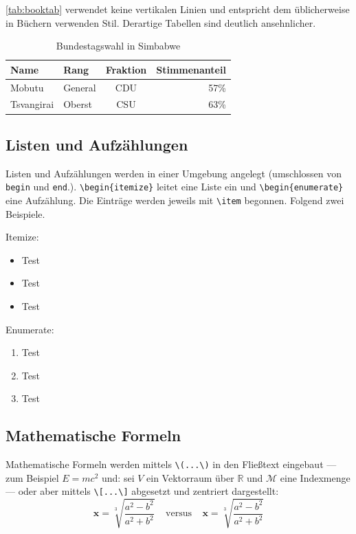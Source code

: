 \autoref{tab:booktab} verwendet keine vertikalen Linien und entspricht dem üblicherweise in Büchern verwenden Stil. Derartige Tabellen sind deutlich ansehnlicher.

\begin{table}[h]
\centering
\begin{tabular} {llcr}
	\toprule
	Name & Rang & Fraktion & Stimmenanteil \\
	\midrule
	Mobutu & General & CDU & 57\% \\
	Tsvangirai & Oberst & CSU & 63\% \\
	\bottomrule
\end{tabular}
\caption {Bundestagswahl in Simbabwe}
\label{tab:booktab}
\end{table}

\subsection{Listen und Aufzählungen}

Listen und Aufzählungen werden in einer Umgebung angelegt (umschlossen von \verb|begin| und \verb|end|.). \verb|\begin{itemize}| leitet eine Liste ein und \verb|\begin{enumerate}| eine Aufzählung. Die Einträge werden jeweils mit \verb|\item| begonnen. Folgend zwei Beispiele.

Itemize:
\begin{itemize}
\item Test
\item Test
\item Test
\end{itemize}

Enumerate:
\begin{enumerate}
\item Test
\item Test
\item Test
\end{enumerate}

\subsection{Mathematische Formeln}

Mathematische Formeln werden mittels \verb|\(...\)|
in den Fließtext eingebaut
--- zum Beispiel \( E=mc^2 \) und:
sei \(V\) ein Vektorraum über \(\mathbb{R}\)
und \(\mathcal{M}\) eine Indexmenge
---
oder aber mittels \verb|\[...\]|
abgesetzt und zentriert dargestellt:
	\[
	\pmb{x} = \sqrt[3]{\frac{a^2-b^2}{a^2+b^2}}
		~~~~~ \text{versus} ~~~~~
	\boldsymbol{x} = \sqrt[3]{\frac{a^2-b^2}{a^2+b^2}}
	\]


